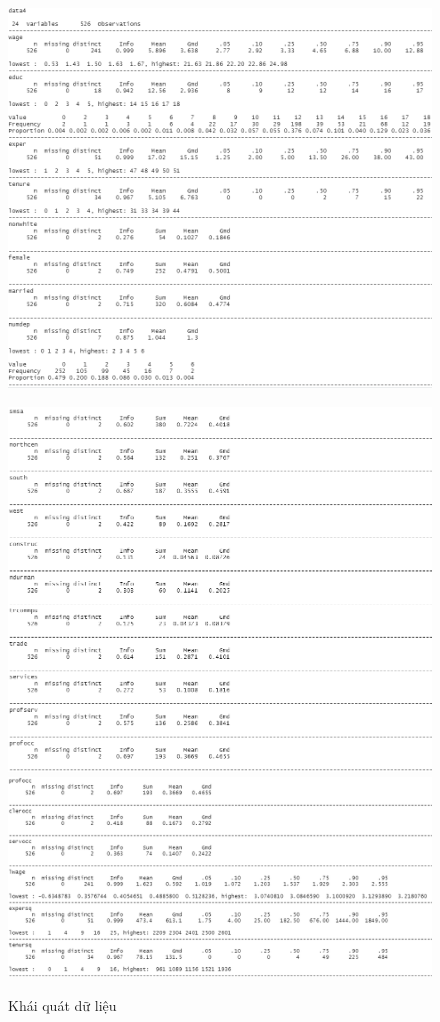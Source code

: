 \begin{figure}[H]
	\centering
	{\includegraphics[width=0.7\linewidth]{../Photo Of Result/describe(4)-1}}
\end{figure}
\begin{figure}[H]
	\centering
	{\includegraphics[width=0.7\linewidth]{../Photo Of Result/describe(4)-2}}
	{\includegraphics[width=0.7\linewidth]{../Photo Of Result/describe(4)-3}}
	\caption{Khái quát dữ liệu}
	\label{describe-4}
\end{figure}

